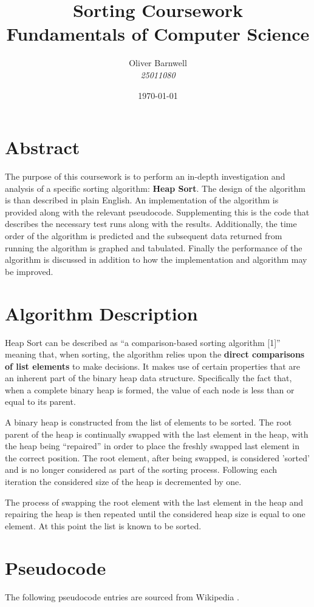 \documentclass{article}
\title{%
  Sorting Coursework \\
  \large Fundamentals of Computer Science
}
\author{Oliver Barnwell\\\textit{25011080}}
\date{\today}
\begin{document}
\lstset{language=Pascal}
\maketitle

\tableofcontents


\section{Abstract}
The purpose of this coursework is to perform an in-depth investigation and analysis of a specific sorting algorithm: \textbf{Heap Sort}. The design of the algorithm is than described in plain English. An implementation of the algorithm is provided along with the relevant pseudocode. Supplementing this is the code that describes the necessary test runs along with the results. Additionally, the time order of the algorithm is predicted and the subsequent data returned from running the algorithm is graphed and tabulated. Finally the performance of the algorithm is discussed in addition to how the implementation and algorithm may be improved.


\section{Algorithm Description}
Heap Sort can be described as  ``a comparison-based sorting algorithm [1]'' meaning that, when sorting, the algorithm relies upon the \textbf{direct comparisons of list elements} to make decisions. It makes use of certain properties that are an inherent part of the binary heap data structure. Specifically the fact that, when a complete binary heap is formed, the value of each node is less than or equal to its parent.

A binary heap is constructed from the list of elements to be sorted. The root parent of the heap is continually swapped with the last element in the heap, with the heap being ``repaired'' in order to place the freshly swapped last element in the correct position. The root element, after being swapped, is considered 'sorted' and is no longer considered as part of the sorting process. Following each iteration the considered size of the heap is decremented by one.

The process of swapping the root element with the last element in the heap and repairing the heap is then repeated until the considered heap size is equal to one element. At this point the list is known to be sorted.
\section{Pseudocode}
The following pseudocode entries are sourced from Wikipedia \cite{wikiheap}.
\end{document}
